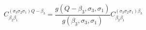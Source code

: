 \begin{equation}
C_{\beta_{2}\beta_{1}}^{(\sigma_{3}\sigma_{2}\sigma_{1})Q-\beta_{3}} =%
\frac{g(Q-\beta_{3},\sigma_{3},\sigma_{1})}{g(\beta_{3},\sigma_{3},\sigma_{1})}
C_{\beta_{2}\beta_{1}}^{(\sigma_{3}\sigma_{2}\sigma_{1})\beta_{3}}\nonumber
\end{equation}

